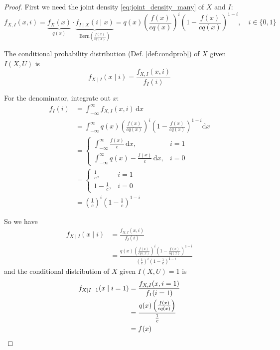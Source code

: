 \documentclass[11pt, headings=standardclasses, parskip=half, twoside]{scrartcl}
\newcommand{\dif}{\mathrm{d}}
\begin{document}
\begin{proof}
  First we need the joint density \eqref{eq:joint_density_many} of \(X\) and \(I\):
  \[
    f_{X,I}(x, i)
    = \underbrace{f_X(x)}_{q(x)} \cdot \underbrace{f_{I \mid X}(i \mid  x)}_{\text{Bern}\left(\frac{f(x)}{c q(x)}\right)} 
    = q(x) \left( \frac{f(x)}{c q(x)} \right)^i \left( 1 - \frac{f(x)}{c q(x)} \right)^{1-i}, \quad i \in \{0, 1\}
  \]
  
  The conditional probability distribution (Def. \ref{def:condprob}) of $X$ given $I(X,U)$ is
  \[
  f_{X \mid I}(x \mid i) = \frac{f_{X,I}(x, i)}{f_I(i)}
  \]
  
  For the denominator, integrate out $x$:
  \begin{align*}
  f_I(i) &= \int_{-\infty}^{\infty} f_{X,I}(x, i) \, \dif x \\
  &= \int_{-\infty}^{\infty} q(x) \left( \frac{f(x)}{c q(x)} \right)^i \left( 1 - \frac{f(x)}{c q(x)} \right)^{1-i} \dif x \\
  &= 
  \begin{cases}
  \int_{-\infty}^{\infty} \frac{f(x)}{c} \, \dif x, & i = 1 \\
  \int_{-\infty}^{\infty} q(x) - \frac{f(x)}{c} \, \dif x, & i = 0
  \end{cases} \\
  &= 
  \begin{cases}
  \frac{1}{c}, & i = 1 \\
  1 - \frac{1}{c}, & i = 0
  \end{cases} \\
  &= \left( \frac{1}{c} \right)^i \left( 1 - \frac{1}{c} \right)^{1-i}
  \end{align*}
  
  So we have
  \begin{align*}
    f_{X \mid I}(x \mid i) &= \frac{f_{X,I}(x, i)}{f_I(i)} \\
    &= \frac{q(x) \left( \frac{f(x)}{c q(x)} \right)^i \left( 1 - \frac{f(x)}{c q(x)} \right)^{1-i}}{\left( \frac{1}{c} \right)^i \left( 1 - \frac{1}{c} \right)^{1-i}}
  \end{align*}
  and the conditional distribution of $X$ given $I(X,U) = 1$ is
  \begin{align*}
  f_{X \mid I=1}(x \mid i = 1) &= \frac{f_{X,I}(x, i=1)}{f_I(i=1)} \\
  &= \frac{q(x) \left( \frac{f(x)}{c q(x)} \right)}{\frac{1}{c}} \\
  &= f(x) \qedhere
  \end{align*}
\end{proof}
\end{document}
